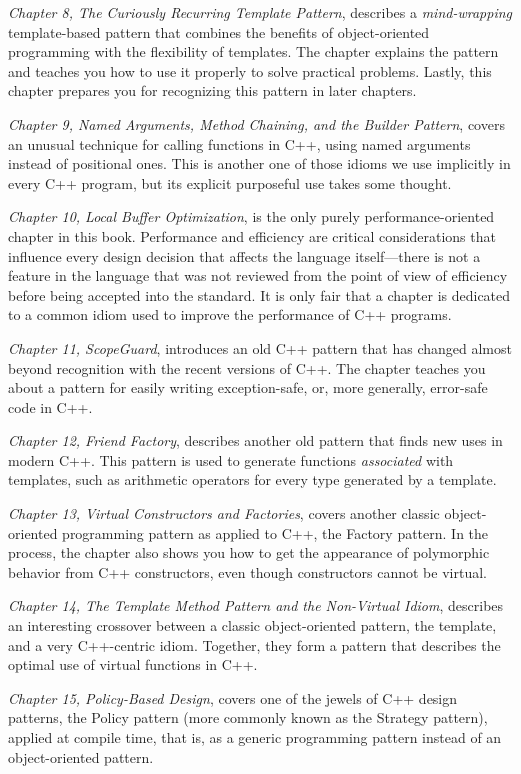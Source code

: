 \emph{Chapter 8, The Curiously Recurring Template Pattern}, describes a \emph{mind-wrapping} template-based pattern that combines the benefits of object-oriented programming with the flexibility of templates. The chapter explains the pattern and teaches you how to use it properly to solve practical problems. Lastly, this chapter prepares you for recognizing this pattern in later chapters.

\emph{Chapter 9, Named Arguments, Method Chaining, and the Builder Pattern}, covers an unusual technique for calling functions in C++, using named arguments instead of positional ones. This is another one of those idioms we use implicitly in every C++ program, but its explicit purposeful use takes some thought.

\emph{Chapter 10, Local Buffer Optimization}, is the only purely performance-oriented chapter in this book. Performance and efficiency are critical considerations that influence every design decision that affects the language itself---there is not a feature in the language that was not reviewed from the point of view of efficiency before being accepted into the standard. It is only fair that a chapter is dedicated to a common idiom used to improve the performance of C++ programs.

\emph{Chapter 11, ScopeGuard}, introduces an old C++ pattern that has changed almost beyond recognition with the recent versions of C++. The chapter teaches you about a pattern for easily writing exception-safe, or, more generally, error-safe code in C++.

\emph{Chapter 12, Friend Factory}, describes another old pattern that finds new uses in modern C++. This pattern is used to generate functions \emph{associated} with templates, such as arithmetic operators for every type generated by a template.

\emph{Chapter 13, Virtual Constructors and Factories}, covers another classic object-oriented programming pattern as applied to C++, the Factory pattern. In the process, the chapter also shows you how to get the appearance of polymorphic behavior from C++ constructors, even though constructors cannot be virtual.

\emph{Chapter 14, The Template Method Pattern and the Non-Virtual Idiom}, describes an interesting crossover between a classic object-oriented pattern, the template, and a very C++-centric idiom. Together, they form a pattern that describes the optimal use of virtual functions in C++.

\emph{Chapter 15, Policy-Based Design}, covers one of the jewels of C++ design patterns, the Policy pattern (more commonly known as the Strategy pattern), applied at compile time, that is, as a generic programming pattern instead of an object-oriented pattern.

